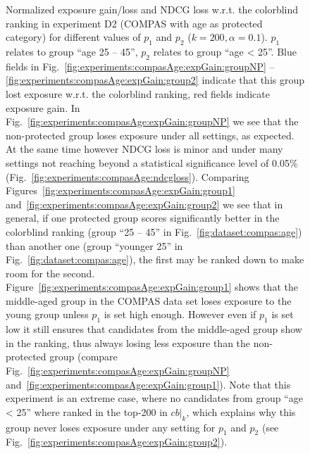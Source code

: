 \begin{figure}[t!]
	\vspace{-3mm}
	\caption{Normalized exposure gain/loss and NDCG loss w.r.t. the colorblind ranking in experiment D2 (COMPAS with age as protected category) for different values of $p_1$ and $p_2$ ($k=200, \alpha=0.1$).
		$p_1$ relates to group ``age 25 -- 45'', $p_2$ relates to group ``age < 25''.
		Blue fields in Fig.~\ref{fig:experiments:compasAge:expGain:groupNP} -- \ref{fig:experiments:compasAge:expGain:group2} indicate that this group lost exposure w.r.t. the colorblind ranking, red fields indicate exposure gain.
		In Fig.~\ref{fig:experiments:compasAge:expGain:groupNP} we see that the non-protected group loses exposure under all settings, as expected.
		At the same time however NDCG loss is minor and under many settings not reaching beyond a statistical significance level of 0.05\% (Fig.~\ref{fig:experiments:compasAge:ndcgloss}).
		Comparing Figures~\ref{fig:experiments:compasAge:expGain:group1} and~\ref{fig:experiments:compasAge:expGain:group2} we see that in general, if one protected group scores significantly better in the colorblind ranking (group ``25 -- 45'' in Fig.~\ref{fig:dataset:compas:age}) than another one (group ``younger 25'' in Fig.~\ref{fig:dataset:compas:age}), the first may be ranked down to make room for the second.
		Figure~\ref{fig:experiments:compasAge:expGain:group1} shows that the middle-aged group in the COMPAS data set loses exposure to the young group unless $p_1$ is set high enough.
		However even if $p_1$ is set low it still ensures that candidates from the middle-aged group show in the ranking, thus always losing less exposure than the non-protected group (compare Fig.~\ref{fig:experiments:compasAge:expGain:groupNP} and~\ref{fig:experiments:compasAge:expGain:group1}).
		Note that this experiment is an extreme case, where no candidates from group ``age < 25'' where ranked in the top-200 in $cb|_k$, which explains why this group never loses exposure under any setting for $p_1$ and $p_2$ (see Fig.~\ref{fig:experiments:compasAge:expGain:group2}).
	}
	\vspace{-\baselineskip}
	\label{fig:results-moving-p}
\end{figure}
